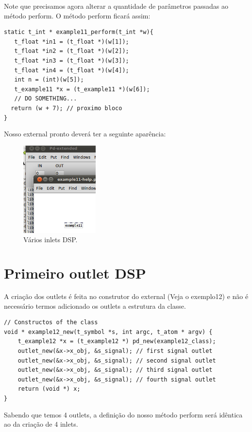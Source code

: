 \documentclass[10pt,a4paper]{report}
\begin{document}
Note que precisamos agora alterar a quantidade de parâmetros passadas ao método perform. O método perform ficará assim:
\begin{lstlisting}
static t_int * example11_perform(t_int *w){
   t_float *in1 = (t_float *)(w[1]);
   t_float *in2 = (t_float *)(w[2]);
   t_float *in3 = (t_float *)(w[3]);
   t_float *in4 = (t_float *)(w[4]);
   int n = (int)(w[5]);
   t_example11 *x = (t_example11 *)(w[6]);
   // DO SOMETHING...
  return (w + 7); // proximo bloco
}
\end{lstlisting}

Nosso external pronto deverá ter a seguinte aparência:
\begin{figure}[h!]
	\centering
	\includegraphics[height=180]{./images/example11}
	\caption{Vários inlets DSP.}
\end{figure}

\section{Primeiro outlet DSP}

A criação dos outlets é feita no construtor do external (Veja o exemplo12) e não é necessário termos adicionado os outlets a estrutura da classe.

\begin{lstlisting}
// Constructos of the class
void * example12_new(t_symbol *s, int argc, t_atom * argv) {
    t_example12 *x = (t_example12 *) pd_new(example12_class);
    outlet_new(&x->x_obj, &s_signal); // first signal outlet
    outlet_new(&x->x_obj, &s_signal); // second signal outlet
    outlet_new(&x->x_obj, &s_signal); // third signal outlet
    outlet_new(&x->x_obj, &s_signal); // fourth signal outlet
    return (void *) x;
}
\end{lstlisting}

Sabendo que temos 4 outlets, a definição do nosso método perform será idêntica ao da criação de 4 inlets.
\end{document}
